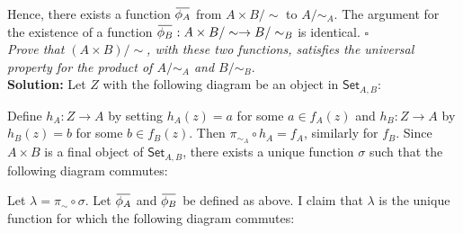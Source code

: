 \documentclass[11pt,a4paper]{article}
\newcommand{\overbar}[1]{\mkern 1.5mu\overline{\mkern-1.5mu#1\mkern-1.5mu}\mkern 1.5mu}
\begin{document}
\noindent Hence, there exists a function $\overbar{\phi_A}$ from $A \times B / \sim$ to $A / \sim_A$.  The argument for the existence of a function $\overbar{\phi_B}: A \times B / \sim \rightarrow B / \sim_B$ is identical. $\square$ \\

\noindent \textit{Prove that $(A \times B)/ \sim$, with these two functions, satisfies the universal property for the product of $A / \sim_A$ and $B / \sim_B$}. \\

\noindent \textbf{Solution: } Let $Z$ with the following diagram be an object in $\textsf{Set}_{A,B}$:

\begin{center}
\end{center}

\noindent Define $h_A: Z \rightarrow A$ by setting $h_A(z) = a$ for some $a \in f_A(z)$ and $h_B: Z \rightarrow A$ by $h_B(z) = b$ for some $b \in f_B(z)$.  Then $\pi_{\sim_A} \circ h_A = f_A$, similarly for $f_B$.  Since $A \times B$ is a final object of $\textsf{Set}_{A,B}$, there exists a unique function $\sigma$ such that the following diagram commutes: 

\begin{center}
\end{center}

\noindent Let $\lambda = \pi_{\sim} \circ \sigma$.  Let $\overbar{\phi_A}$ and $\overbar{\phi_B}$ be defined as above.  I claim that $\lambda$ is the unique function for which the following diagram commutes:

\begin{center}
\end{center}
\end{document}
